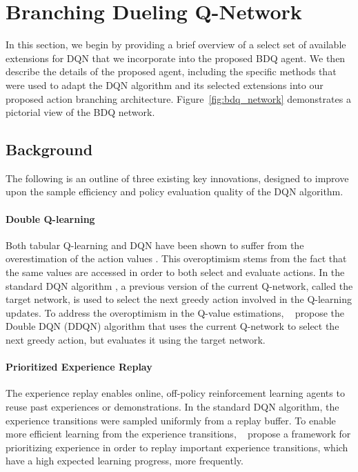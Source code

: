 \documentclass[letterpaper]{article}
\newcommand{\citet}[1]
{\citeauthor{#1}~\shortcite{#1}}
\newcommand{\citep}{\cite}
\begin{document}
\section{Branching Dueling Q-Network}
\label{sec:bdq}

In this section, we begin by providing a brief overview of a select set of available extensions for DQN that we incorporate into the proposed BDQ agent. We then describe the details of the proposed agent, including the specific methods that were used to adapt the DQN algorithm and its selected extensions into our proposed action branching architecture. Figure~\ref{fig:bdq_network} demonstrates a pictorial view of the BDQ network.


\subsection{Background}
\label{subsec:background}

The following is an outline of three existing key innovations, designed to improve upon the sample efficiency and policy evaluation quality of the DQN algorithm.

\paragraph{Double Q-learning} Both tabular Q-learning and DQN have been shown to suffer from the overestimation of the action values \citep{Hasselt:2010dq,Hasselt:2016ddq}. This overoptimism stems from the fact that the same values are accessed in order to both select and evaluate actions. In the standard DQN algorithm \citep{Mnih:2013,Mnih:2015natureDQN}, a previous version of the current Q-network, called the target network, is used to select the next greedy action involved in the Q-learning updates. To address the overoptimism in the Q-value estimations, \citet{Hasselt:2016ddq} propose the Double DQN (DDQN) algorithm that uses the current Q-network to select the next greedy action, but evaluates it using the target network.

\paragraph{Prioritized Experience Replay} The experience replay enables online, off-policy reinforcement learning agents to reuse past experiences or demonstrations. In the standard DQN algorithm, the experience transitions were sampled uniformly from a replay buffer. To enable more efficient learning from the experience transitions, \citet{Schaul:2016prior} propose a framework for prioritizing experience in order to replay important experience transitions, which have a high expected learning progress, more frequently.
\end{document}
